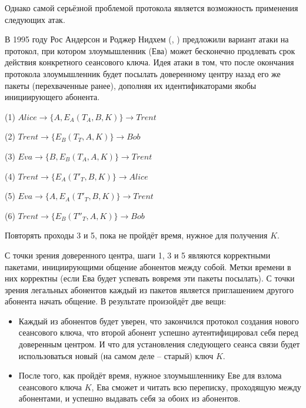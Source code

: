 Однако самой серьёзной проблемой протокола является возможность применения следующих атак.

В 1995 году Рос Андерсон и Роджер Нидхем (, \cite{Anderson:Needham:1995}) предложили вариант атаки на протокол, при котором злоумышленник (Ева) может бесконечно продлевать срок действия конкретного сеансового ключа. Идея атаки в том, что после окончания протокола злоумышленник будет посылать доверенному центру назад его же пакеты (перехваченные ранее), дополняя их идентификаторами якобы инициирующего абонента.

\begin{protocol}
	\item[(1)] $Alice \to \{ A, E_A \left( T_A, B, K \right) \} \to Trent$
	\item[(2)] $Trent \to \{ E_B \left( T_T, A, K \right) \} \to Bob$
	\item[(3)] $Eva \to \{ B, E_B \left( T_A, A, K \right) \} \to Trent$
	\item[(4)] $Trent \to \{ E_A \left( T'_T, B, K \right) \} \to Alice$
	\item[(5)] $Eva \to \{ A, E_A \left( T'_T, B, K \right) \} \to Trent$
	\item[(6)] $Trent \to \{ E_B \left( T''_T, A, K \right) \} \to Bob$
	\item[{}] Повторять проходы 3 и 5, пока не пройдёт время, нужное для получения $K$.
\end{protocol}

С точки зрения доверенного центра, шаги 1, 3 и 5 являются корректными пакетами, инициирующими общение абонентов между собой. Метки времени в них корректны (если Ева будет успевать вовремя эти пакеты посылать). С точки зрения легальных абонентов каждый из пакетов является приглашением другого абонента начать общение. В результате произойдёт две вещи:

\begin{itemize}
	\item Каждый из абонентов будет уверен, что закончился протокол создания нового сеансового ключа, что второй абонент успешно аутентифицировал себя перед доверенным центром. И что для установления следующего сеанса связи будет использоваться новый (на самом деле -- старый) ключ $K$.
	\item После того, как пройдёт время, нужное злоумышленнику Еве для взлома сеансового ключа $K$, Ева сможет и читать всю переписку, проходящую между абонентами, и успешно выдавать себя за обоих из абонентов.
\end{itemize}

